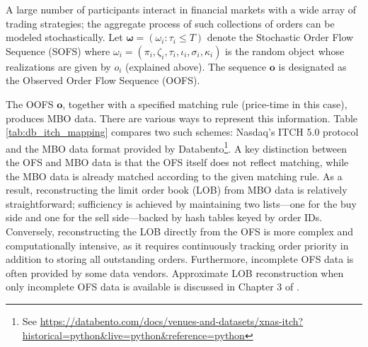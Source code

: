 \documentclass[10pt,a4paper,oneside]{article}
\begin{document}
A large number of participants interact in financial markets with a wide array of trading strategies; the aggregate process of such collections of orders can be modeled stochastically. Let $\boldsymbol{\omega} = (\omega_i : \tau_i \leq T)$ denote the Stochastic Order Flow Sequence (SOFS) where $\omega_i = (\pi_i, \zeta_i, \tau_i, \iota_i, \sigma_i, \kappa_i)$ is the random object whose realizations are given by $o_i$ (explained above). The sequence $\mathbf{o}$ is designated as the Observed Order Flow Sequence (OOFS).

The OOFS $\mathbf{o}$, together with a specified matching rule (price-time in this case), produces MBO data. There are various ways to represent this information. Table \ref{tab:db_itch_mapping} compares two such schemes: Nasdaq’s ITCH 5.0 protocol \cite{nasdaq2014itch} and the MBO data format provided by Databento\footnote{See \url{https://databento.com/docs/venues-and-datasets/xnas-itch?historical=python&live=python&reference=python}}. A key distinction between the OFS and MBO data is that the OFS itself does not reflect matching, while the MBO data is already matched according to the given matching rule. As a result, reconstructing the limit order book (LOB) from MBO data is relatively straightforward; sufficiency is achieved by maintaining two lists—one for the buy side and one for the sell side—backed by hash tables keyed by order IDs. Conversely, reconstructing the LOB directly from the OFS is more complex and computationally intensive, as it requires continuously tracking order priority in addition to storing all outstanding orders. Furthermore, incomplete OFS data is often provided by some data vendors. Approximate LOB reconstruction when only incomplete OFS data is available is discussed in Chapter 3 of \cite{richards2019modelling}.
\end{document}
